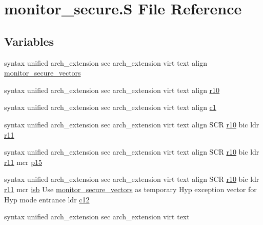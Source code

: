 \hypertarget{monitor__secure_8_s}{\section{monitor\-\_\-secure.\-S \-File \-Reference}
\label{monitor__secure_8_s}
}
\subsection*{\-Variables}
\begin{DoxyCompactItemize}
\item 
syntax unified arch\-\_\-extension \*
sec arch\-\_\-extension virt text \*
align \hyperlink{monitor__secure_8_s_a4d354f7295ddc2f288384d4e03458837}{monitor\-\_\-secure\-\_\-vectors}
\item 
syntax unified arch\-\_\-extension \*
sec arch\-\_\-extension virt text \*
align \hyperlink{monitor__secure_8_s_ac3bf51173e39a81ec089049af2b9b854}{r10}
\item 
syntax unified arch\-\_\-extension \*
sec arch\-\_\-extension virt text \*
align \hyperlink{monitor__secure_8_s_ab6ea2e389efb51db2c662047a8c2d198}{c1}
\item 
syntax unified arch\-\_\-extension \*
sec arch\-\_\-extension virt text \*
align \-S\-C\-R \hyperlink{monitor__secure_8_s_ac3bf51173e39a81ec089049af2b9b854}{r10} bic ldr \hyperlink{monitor__secure_8_s_a8788e5e3f963472b5ed8405a3340c314}{r11}
\item 
syntax unified arch\-\_\-extension \*
sec arch\-\_\-extension virt text \*
align \-S\-C\-R \hyperlink{monitor__secure_8_s_ac3bf51173e39a81ec089049af2b9b854}{r10} bic ldr \hyperlink{monitor__secure_8_s_a8788e5e3f963472b5ed8405a3340c314}{r11} mcr \hyperlink{monitor__secure_8_s_a371ca5bf2f81d00215d5d65d975819b3}{p15}
\item 
syntax unified arch\-\_\-extension \*
sec arch\-\_\-extension virt text \*
align \-S\-C\-R \hyperlink{monitor__secure_8_s_ac3bf51173e39a81ec089049af2b9b854}{r10} bic ldr \hyperlink{monitor__secure_8_s_a8788e5e3f963472b5ed8405a3340c314}{r11} mcr \*
\hyperlink{asm-arm__inline_8h_a14f7cb726dd83983648772947d1e60d8}{isb} \-Use \hyperlink{monitor__secure_8_s_a4d354f7295ddc2f288384d4e03458837}{monitor\-\_\-secure\-\_\-vectors} \*
as temporary \-Hyp exception \*
vector for \-Hyp mode entrance \*
ldr \hyperlink{monitor__secure_8_s_ae1450584a05b000986bddb6b03665f0d}{c12}
\item 
syntax unified arch\-\_\-extension \*
sec arch\-\_\-extension virt text \*

\end{DoxyCompactItemize}

